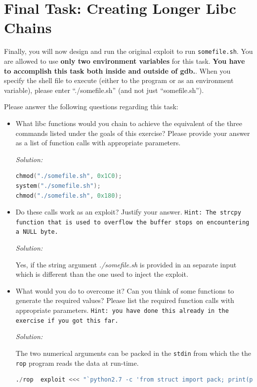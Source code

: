 \documentclass[a4paper,11pt]{article}
\newenvironment{solution}%
{\par{\noindent\small\textit{Solution:}}\vspace{-12pt}\begin{framed}}%
{\end{framed}\par}
\begin{document}
\section*{Final Task: Creating Longer Libc Chains}
Finally, you will now design and run the original exploit to run
\texttt{somefile.sh}. You are allowed to use \textbf{only two environment
  variables} for this task. \textbf{You have to accomplish this task both inside
  and outside of gdb.}.  When you specify the shell file to execute (either to
the program or as an environment variable), please enter ``./somefile.sh'' (and
not just ``somefile.sh''). 

\noindent Please answer the following questions regarding this task:

\begin{itemize}
\item What libc functions would you chain to achieve the equivalent of the three
  commands listed under the goals of this exercise? Please provide your answer as
  a list of function calls with appropriate parameters.
\ifsolution\begin{solution}
\begin{lstlisting}[language=c]
chmod("./somefile.sh", 0x1C0);
system("./somefile.sh");
chmod("./somefile.sh", 0x180);
\end{lstlisting}
\end{solution}\fi
\item Do these calls work as an exploit? Justify your
  answer. \texttt{Hint: The \texttt{strcpy} function that is used to overflow
    the buffer stops on encountering a \texttt{NULL} byte.}
\ifsolution\begin{solution}
Yes, if the string argument \emph{./somefile.sh} is provided in an separate input which is different than the one used to inject the exploit. 
\end{solution}\fi
\item What would you do to overcome it? Can you think of some functions to
generate the required values? Please list the
  required function calls with appropriate parameters. \texttt{Hint:
    you have done this already in the exercise if you got this far.}
\ifsolution\begin{solution}
The two numerical arguments can be packed in the \texttt{stdin} from which the the \texttt{rop} program reads the data at run-time.
\begin{lstlisting}[language=python]
./rop  exploit <<< "`python2.7 -c 'from struct import pack; print(pack("I", 0x000001C0) + pack("I", 0x00000180))'`"
\end{lstlisting} 


\end{solution}
\end{itemize}
\end{document}
